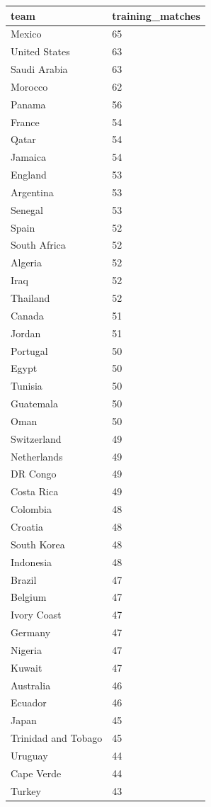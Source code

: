 \begin{tabular}{ll}
\toprule
team & training\_matches \\
\midrule
Mexico & 65 \\
United States & 63 \\
Saudi Arabia & 63 \\
Morocco & 62 \\
Panama & 56 \\
France & 54 \\
Qatar & 54 \\
Jamaica & 54 \\
England & 53 \\
Argentina & 53 \\
Senegal & 53 \\
Spain & 52 \\
South Africa & 52 \\
Algeria & 52 \\
Iraq & 52 \\
Thailand & 52 \\
Canada & 51 \\
Jordan & 51 \\
Portugal & 50 \\
Egypt & 50 \\
Tunisia & 50 \\
Guatemala & 50 \\
Oman & 50 \\
Switzerland & 49 \\
Netherlands & 49 \\
DR Congo & 49 \\
Costa Rica & 49 \\
Colombia & 48 \\
Croatia & 48 \\
South Korea & 48 \\
Indonesia & 48 \\
Brazil & 47 \\
Belgium & 47 \\
Ivory Coast & 47 \\
Germany & 47 \\
Nigeria & 47 \\
Kuwait & 47 \\
Australia & 46 \\
Ecuador & 46 \\
Japan & 45 \\
Trinidad and Tobago & 45 \\
Uruguay & 44 \\
Cape Verde & 44 \\
Turkey & 43 \\

\end{tabular}
